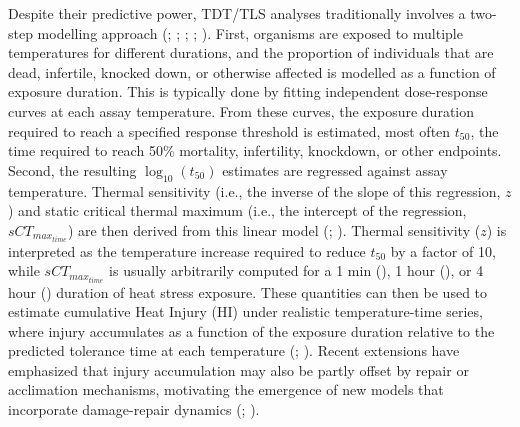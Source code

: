 \documentclass[
  11pt,
]{article}
\begin{document}
Despite their predictive power, TDT/TLS analyses traditionally involves
a two-step modelling approach
(;
;
;
; ). First,
organisms are exposed to multiple temperatures for different durations,
and the proportion of individuals that are dead, infertile, knocked
down, or otherwise affected is modelled as a function of exposure
duration. This is typically done by fitting independent dose-response
curves at each assay temperature. From these curves, the exposure
duration required to reach a specified response threshold is estimated,
most often \(t_{50}\), the time required to reach 50\% mortality,
infertility, knockdown, or other endpoints. Second, the resulting
\(\log_{10}(t_{50})\) estimates are regressed against assay temperature.
Thermal sensitivity (i.e., the inverse of the slope of this regression,
\(z\)) and static critical thermal maximum (i.e., the intercept of the
regression, \(sCT_{max_{time}}\)) are then derived from this linear
model (;
).
Thermal sensitivity (\(z\)) is interpreted as the temperature increase
required to reduce \(t_{50}\) by a factor of 10, while
\(sCT_{max_{time}}\) is usually arbitrarily computed for a 1 min
(), 1
hour (), or 4 hour () duration of heat stress exposure. These quantities can then
be used to estimate cumulative Heat Injury (HI) under realistic
temperature-time series, where injury accumulates as a function of the
exposure duration relative to the predicted tolerance time at each
temperature (; ). Recent extensions have emphasized that injury accumulation may
also be partly offset by repair or acclimation mechanisms, motivating
the emergence of new models that incorporate damage-repair dynamics
(;
).
\end{document}
